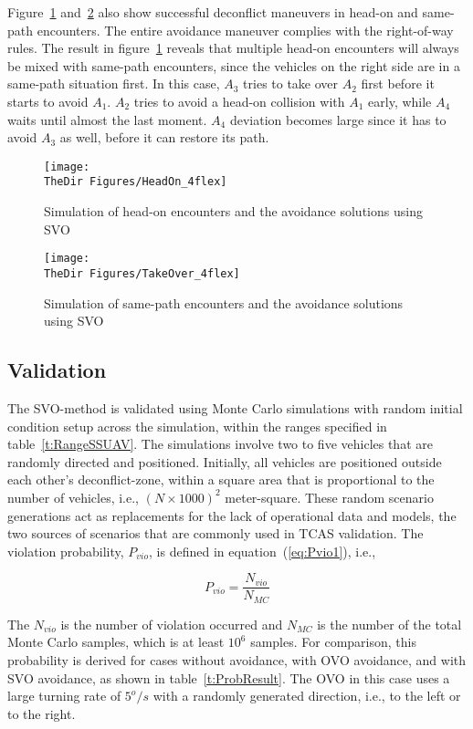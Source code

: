 Figure~\ref{f:HeadOn_ab} and~\ref{f:TakeOver_ab} also show successful deconflict maneuvers in head-on and same-path encounters. The entire avoidance maneuver complies with the right-of-way rules. The result in figure~\ref{f:HeadOn_ab} reveals that multiple head-on encounters will always be mixed with same-path encounters, since the vehicles on the right side are in a same-path situation first. In this case, $A_3$ tries to take over $A_2$ first before it starts to avoid $A_1$. $A_2$ tries to avoid a head-on collision with $A_1$ early, while $A_4$ waits until almost the last moment. $A_4$ deviation becomes large since it has to avoid $A_3$ as well, before it can restore its path.


\begin{figure}[h!]
\centering
\texttt{[image: \\TheDir Figures/HeadOn\_4flex]}
 \caption{Simulation of head-on encounters and the avoidance solutions using SVO}
 \label{f:HeadOn_ab}
\end{figure}

\begin{figure}[h!]
\centering
\texttt{[image: \\TheDir Figures/TakeOver\_4flex]}
 \caption{Simulation of same-path encounters and the avoidance solutions using SVO}
 \label{f:TakeOver_ab}
\end{figure}

\subsection{Validation}
The SVO-method is validated using Monte Carlo simulations with random initial condition setup across the simulation, within the ranges specified in table~\ref{t:RangeSSUAV}. The simulations involve two to five vehicles that are randomly directed and positioned. Initially, all vehicles are positioned outside each other's deconflict-zone, within a square area that is proportional to the number of vehicles, i.e., $(N\times 1000)^2$ meter-square. These random scenario generations act as replacements for the lack of operational data and models, the two sources of scenarios that are commonly used in TCAS validation\cite{kochenderfer:2012}. The violation probability, $P_{vio}$, is defined in equation~(\ref{eq:Pvio1}), i.e.,

\begin{equation}
\label{eq:Pvio1}
{P_{vio}} = \frac{{{N_{vio}}}}{{{N_{MC}}}}
\end{equation}

The $N_{vio}$ is the number of violation occurred and $N_{MC}$ is the number of the total Monte Carlo samples, which is at least $10^6$ samples. For comparison, this probability is derived for cases without avoidance, with OVO avoidance, and with SVO avoidance, as shown in table~\ref{t:ProbResult}. The OVO in this case uses a large turning rate of $5^o/s$ with a randomly generated direction, i.e., to the left or to the right.

